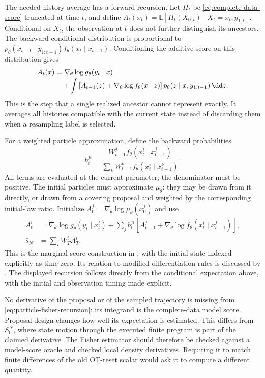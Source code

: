 The needed history average has a forward recursion. Let $H_t$ be
\eqref{eq:complete-data-score} truncated at time $t$, and define
$A_t(x_t)=\mathbb E[H_t(X_{0:t})\mid X_t=x_t,y_{1:t}]$. Conditional on
$X_t$, the observation at $t$ does not further distinguish its ancestors.
The backward conditional distribution is proportional to
$p_\theta(x_{t-1}\mid y_{1:t-1})f_\theta(x_t\mid x_{t-1})$.
Conditioning the additive score on this distribution gives
\begin{align}
 A_t(x)&=\nabla_\theta\log g_\theta(y_t\mid x)
 \notag\\[-2pt]
 &\quad+\int\left[A_{t-1}(z)
           +\nabla_\theta\log f_\theta(x\mid z)\right]
       p_\theta(z\mid x,y_{1:t-1})\,\dd z.
 \label{eq:fisher-conditional-recursion}
\end{align}
This is the step that a single realized ancestor cannot represent exactly.
It averages all histories compatible with the current state instead of
discarding them when a resampling label is selected.

For a weighted particle approximation, define the backward probabilities
\begin{equation}
 b_t^{ji}=
 \frac{W_{t-1}^j f_\theta(x_t^i\mid x_{t-1}^j)}
      {\sum_kW_{t-1}^k f_\theta(x_t^i\mid x_{t-1}^k)}.
 \label{eq:backward-particle-probabilities}
\end{equation}
All terms are evaluated at the current parameter; the denominator must be
positive. The initial particles must approximate $\mu_\theta$: they may be
drawn from it directly, or drawn from a covering proposal and weighted by
the corresponding initial-law ratio. Initialize
$A_0^j=\nabla_\theta\log\mu_\theta(x_0^j)$ and use
\begin{align}
 A_t^i&=\nabla_\theta\log g_\theta(y_t\mid x_t^i)
       +\sum_j b_t^{ji}\left[A_{t-1}^j
          +\nabla_\theta\log f_\theta(x_t^i\mid x_{t-1}^j)\right],\\
 \widehat s_N&=\sum_i W_T^i A_T^i.
 \label{eq:particle-fisher-recursion}
\end{align}
This is the marginal-score construction in
\citet[Section 2.2, Algorithm 2, equations (20) and (22)]{poyiadjis2011particle},
with the initial state indexed explicitly as time zero. Its relation to
modified differentiation rules is discussed by
\citet[Section 4.2, equations (24)--(25)]{scibior2021dpf}. The displayed
recursion follows directly from the conditional expectation above, with the
initial and observation timing made explicit.

No derivative of the proposal or of the sampled trajectory is missing from
\eqref{eq:particle-fisher-recursion}: its integrand is the complete-data
model score. Proposal design changes how well its expectation is estimated.
This differs from $S_0^N$, where state motion through the executed finite
program is part of the claimed derivative. The Fisher estimator should
therefore be checked against a model-score oracle and checked local density
derivatives. Requiring it to match finite differences of the old OT-reset
scalar would ask it to compute a different quantity.

